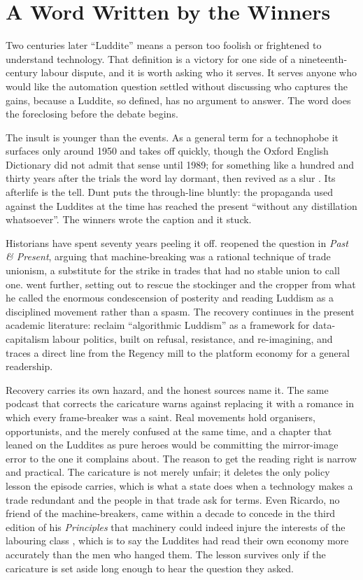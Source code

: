 \section{A Word Written by the Winners}

Two centuries later ``Luddite'' means a person too foolish or frightened to understand technology. That definition is a victory for one side of a nineteenth-century labour dispute, and it is worth asking who it serves. It serves anyone who would like the automation question settled without discussing who captures the gains, because a Luddite, so defined, has no argument to answer. The word does the foreclosing before the debate begins.

The insult is younger than the events. As a general term for a technophobe it surfaces only around 1950 and takes off quickly, though the Oxford English Dictionary did not admit that sense until 1989; for something like a hundred and thirty years after the trials the word lay dormant, then revived as a slur \parencite{LynskeyDunt2026Luddites}. Its afterlife is the tell. Dunt puts the through-line bluntly: the propaganda used against the Luddites at the time has reached the present ``without any distillation whatsoever''. The winners wrote the caption and it stuck.

Historians have spent seventy years peeling it off. \textcite{Hobsbawm1952} reopened the question in \emph{Past \& Present}, arguing that machine-breaking was a rational technique of trade unionism, a substitute for the strike in trades that had no stable union to call one. \textcite{Thompson1963} went further, setting out to rescue the stockinger and the cropper from what he called the enormous condescension of posterity and reading Luddism as a disciplined movement rather than a spasm. The recovery continues in the present academic literature: \textcite{CharitsisLaamanenLehtiniemi2024} reclaim ``algorithmic Luddism'' as a framework for data-capitalism labour politics, built on refusal, resistance, and re-imagining, and \textcite{Merchant2023} traces a direct line from the Regency mill to the platform economy for a general readership.

Recovery carries its own hazard, and the honest sources name it. The same podcast that corrects the caricature warns against replacing it with a romance in which every frame-breaker was a saint. Real movements hold organisers, opportunists, and the merely confused at the same time, and a chapter that leaned on the Luddites as pure heroes would be committing the mirror-image error to the one it complains about. The reason to get the reading right is narrow and practical. The caricature is not merely unfair; it deletes the only policy lesson the episode carries, which is what a state does when a technology makes a trade redundant and the people in that trade ask for terms. Even Ricardo, no friend of the machine-breakers, came within a decade to concede in the third edition of his \emph{Principles} that machinery could indeed injure the interests of the labouring class \parencite{Ricardo1821}, which is to say the Luddites had read their own economy more accurately than the men who hanged them. The lesson survives only if the caricature is set aside long enough to hear the question they asked.

